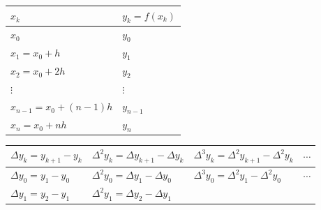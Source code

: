 \documentclass[openany]{book}
\begin{document}
\begin{longtable}[]{@{}ll@{}}
\toprule
\(x_k\) & \(y_k = f(x_k)\)\tabularnewline
\midrule
\endhead
\(x_0\) & \(y_0\)\tabularnewline
\(x_1 = x_0 + h\) & \(y_1\)\tabularnewline
\(x_2 = x_0 + 2 h\) & \(y_2\)\tabularnewline
\(\vdots\) & \(\vdots\)\tabularnewline
\(x_{n-1} = x_0 + (n-1) h\) & \(y_{n-1}\)\tabularnewline
\(x_{n} = x_0 + n h\) & \(y_n\)\tabularnewline
\bottomrule
\end{longtable}

\begin{longtable}[]{@{}llll@{}}
\toprule
\begin{minipage}[b]{0.22\columnwidth}\raggedright
\(\Delta y_k = y_{k+1} - y_k\)\strut
\end{minipage} & \begin{minipage}[b]{0.29\columnwidth}\raggedright
\(\Delta^2 y_k = \Delta y_{k+1} - \Delta y_k\)\strut
\end{minipage} & \begin{minipage}[b]{0.31\columnwidth}\raggedright
\(\Delta^3 y_k = \Delta^2 y_{k+1} - \Delta^2 y_k\)\strut
\end{minipage} & \begin{minipage}[b]{0.06\columnwidth}\raggedright
\(\cdots\)\strut
\end{minipage}\tabularnewline
\midrule
\endhead
\begin{minipage}[t]{0.22\columnwidth}\raggedright
\(\Delta y_0 = y_1 - y_0\)\strut
\end{minipage} & \begin{minipage}[t]{0.29\columnwidth}\raggedright
\(\Delta^2 y_0 = \Delta y_{1} - \Delta y_0\)\strut
\end{minipage} & \begin{minipage}[t]{0.31\columnwidth}\raggedright
\(\Delta^3 y_0 = \Delta^2 y_{1} - \Delta^2 y_0\)\strut
\end{minipage} & \begin{minipage}[t]{0.06\columnwidth}\raggedright
\(\cdots\)\strut
\end{minipage}\tabularnewline
\begin{minipage}[t]{0.22\columnwidth}\raggedright
\(\Delta y_1 = y_2 - y_1\)\strut
\end{minipage} & \begin{minipage}[t]{0.29\columnwidth}\raggedright
\(\Delta^2 y_1 = \Delta y_{2} - \Delta y_1\)\strut
\end{minipage} & \begin{minipage}[t]{0.31\columnwidth}\raggedright

\end{minipage}
\end{longtable}
\end{document}
